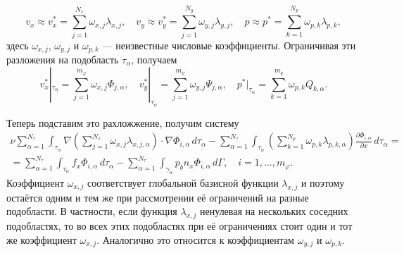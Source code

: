 \documentclass[a4paper,14pt]{extarticle}
\begin{document}
\begin{equation}
	v_x \approx
	v_x^*
	=
	\sum_{j=1}^{N_x}\omega_{x,j}\lambda_{x,j},
	\quad
	v_y\approx
	v_y^*
	=
	\sum_{j=1}^{N_y}\omega_{y,j}\lambda_{y,j},
	\quad
	p \approx
	p^*
	=
	\sum_{k=1}^{N_p}\omega_{p,k}\lambda_{p,k},
\end{equation}
здесь $\omega_{x,j}$, $\omega_{y,j}$ и $\omega_{p,k}$ ---
неизвестные числовые коэффициенты.
Ограничивая эти разложения на подобласть $\tau_\alpha$,
получаем
\begin{equation}
	v_x^*|_{\tau_\alpha}
	=
	\sum_{j=1}^{m_\varphi}
	\omega_{x,j}\Phi_{j,\alpha},
	\quad
	v_y^*|_{\tau_\alpha}
	=
	\sum_{j=1}^{m_\psi}
	\omega_{y,j}\Psi_{j,\alpha},
	\quad
	p^*|_{\tau_\alpha}
	=
	\sum_{k=1}^{m_q}
	\omega_{p,k}Q_{k,\alpha}.
	\label{eq:local_approximation}
\end{equation}

Теперь подставим это рахложжение, получим систему
\begin{equation}
	\begin{gathered}
		\nu\sum_{\alpha=1}^{N_\tau}
		\int_{\tau_\alpha}
		\nabla\left(
			\sum_{j=1}^{N_x}
			\omega_{x,j}\lambda_{x,j,\alpha}
		\right)
		\cdot\nabla\Phi_{i,\alpha}\,d\tau_\alpha
		-
		\sum_{\alpha=1}^{N_\tau}
		\int_{\tau_\alpha}
		\left(
			\sum_{k=1}^{N_p}
			\omega_{p,k}\lambda_{p,k,\alpha}
		\right)
		\frac{\partial\Phi_{i,\alpha}}{\partial x}
		\,d\tau_\alpha
		=\\
		=
		\sum_{\alpha=1}^{N_\tau}
		\int_{\tau_\alpha}
		f_x\Phi_{i,\alpha}\,d\tau_\alpha
		-
		\sum_{\alpha=1}^{N_\tau}
		\int_{\gamma_\alpha}
		p_b n_x\Phi_{i,\alpha}\,d\Gamma,
		\quad i=1,\ldots,m_\varphi.
	\end{gathered}
\end{equation}
Коэффициент $\omega_{x,j}$ соответствует глобальной базисной
функции $\lambda_{x,j}$ и поэтому остаётся одним и тем же
при рассмотрении её ограничений на разные подобласти.
В частности, если функция $\lambda_{x,j}$ ненулевая на
нескольких соседних подобластях, то во всех этих подобластях
при её ограничениях стоит один и тот же коэффициент
$\omega_{x,j}$. Аналогично это относится к коэффициентам
$\omega_{y,j}$ и $\omega_{p,k}$.
\end{document}
